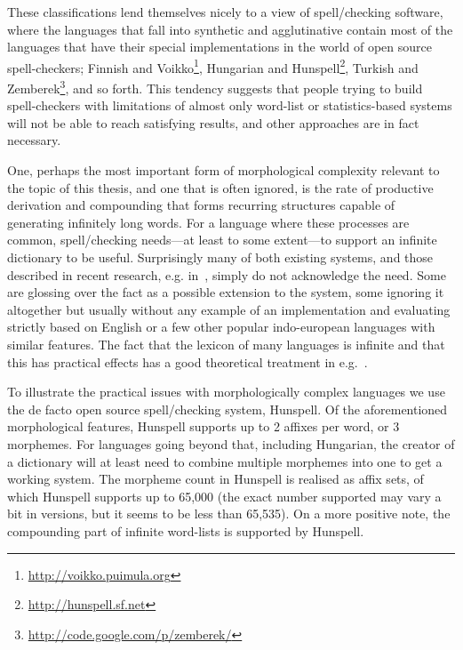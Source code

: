\documentclass[officiallayout]{unihelcompling}
\begin{document}
These classifications lend themselves nicely to a view of spell\-/checking
software, where the languages that fall into synthetic and agglutinative
contain most of the languages that have their special implementations in the
world of open source spell-checkers; Finnish and
Voikko\footnote{\url{http://voikko.puimula.org}}, Hungarian and
Hunspell\footnote{\url{http://hunspell.sf.net}}, Turkish and
Zemberek\footnote{\url{http://code.google.com/p/zemberek/}}, and so forth.
This tendency suggests that people trying to build spell-checkers with
limitations of almost only word-list or statistics-based systems will not be
able to reach satisfying results, and other approaches are in fact necessary.

One, perhaps the most important form of morphological complexity relevant to
the topic of this thesis, and one that is often ignored, is the rate of
productive derivation and compounding that forms recurring structures capable
of generating infinitely long words. For a language where these processes are
common, spell\-/checking needs---at least to some extent---to support an
infinite dictionary to be useful. Surprisingly many of both existing systems,
and those described in recent research, e.g.
in~\cite{hassan2008language,watson2003new}, simply do not acknowledge the need.
Some are glossing over the fact as a possible extension to the system, some
ignoring it altogether but usually without any example of an implementation and
evaluating strictly based on English or a few other popular indo-european
languages with similar features.  The fact that the lexicon of many languages
is infinite and that this has practical effects has a good theoretical
treatment in e.g.~\citet{kornai2002many}.

To illustrate the practical issues with morphologically complex languages we
use the de facto open source spell\-/checking system, Hunspell. Of the
aforementioned morphological features, Hunspell supports up to 2 affixes per
word, or 3 morphemes. For languages going beyond that, including Hungarian, the
creator of a dictionary will at least need to combine multiple morphemes into
one to get a working system. The morpheme count in Hunspell is realised as
affix sets, of which Hunspell supports up to 65,000 (the exact number supported
may vary a bit in versions, but it seems to be less than 65,535). On a more
positive note, the compounding part of infinite word-lists is supported by
Hunspell.
\end{document}
